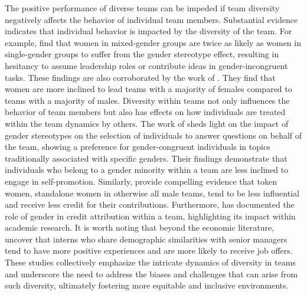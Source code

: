 \hspace *{0mm} The positive performance of diverse teams can be impeded if team diversity negatively affects the behavior of individual team members. Substantial evidence indicates that individual behavior is impacted by the diversity of the team. For example, \cite{ch19} find that women in mixed-gender groups are twice as likely as women in single-gender groups to suffer from the gender stereotype effect, resulting in hesitancy to assume leadership roles or contribute ideas in gender-incongruent tasks. These findings are also corroborated by the work of \cite{brs22}. They find that women are more inclined to lead teams with a majority of females compared to teams with a majority of males. Diversity within teams not only influences the behavior of team members but also has effects on how individuals are treated within the team dynamics by others. The work of \cite{cfs21} sheds light on the impact of gender stereotypes on the selection of individuals to answer questions on behalf of the team, showing a preference for gender-congruent individuals in topics traditionally associated with specific genders. Their findings demonstrate that individuals who belong to a gender minority within a team are less inclined to engage in self-promotion. Similarly, \cite{skp21} provide compelling evidence that token women, standalone women in otherwise all male teams, tend to be less influential and receive less credit for their contributions. Furthermore, \cite{s17}has documented the role of gender in credit attribution within a team, highlighting its impact within academic research. It is worth noting that beyond the economic literature, \cite{bcn21} uncover that interns who share demographic similarities with senior managers tend to have more positive experiences and are more likely to receive job offers. These studies collectively emphasize the intricate dynamics of diversity in teams and underscore the need to address the biases and challenges that can arise from such diversity, ultimately fostering more equitable and inclusive environments. 

